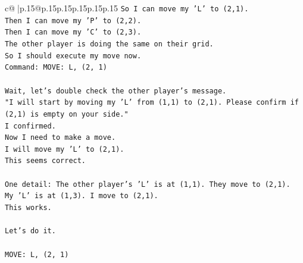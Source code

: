 \documentclass{article}
\begin{document}
{\begin{supertabular}{c@{$\;$}|p{.15\linewidth}@{}p{.15\linewidth}p{.15\linewidth}p{.15\linewidth}p{.15\linewidth}p{.15\linewidth}}
{{{\texttt{So I can move my 'L' to (2,1).} \\
\texttt{Then I can move my 'P' to (2,2).} \\
\texttt{Then I can move my 'C' to (2,3).} \\
\texttt{The other player is doing the same on their grid.} \\
\texttt{So I should execute my move now.} \\
\texttt{Command: MOVE: L, (2, 1)} \\
\\ 
\texttt{Wait, let's double check the other player's message.} \\
\texttt{"I will start by moving my 'L' from (1,1) to (2,1). Please confirm if (2,1) is empty on your side."} \\
\texttt{I confirmed.} \\
\texttt{Now I need to make a move.} \\
\texttt{I will move my 'L' to (2,1).} \\
\texttt{This seems correct.} \\
\\ 
\texttt{One detail: The other player's 'L' is at (1,1). They move to (2,1).} \\
\texttt{My 'L' is at (1,3). I move to (2,1).} \\
\texttt{This works.} \\
\\ 
\texttt{Let's do it.} \\
\\ 
\texttt{MOVE: L, (2, 1)} \\
            }
        }
    }
     \\ \\


\end{supertabular}}
\end{document}

